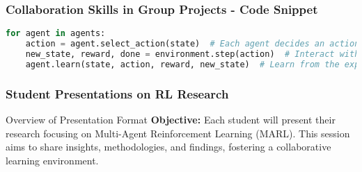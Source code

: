 \documentclass[aspectratio=169]{beamer}
\begin{document}
\begin{frame}[fragile]
    \frametitle{Collaboration Skills in Group Projects - Code Snippet}
    \begin{lstlisting}[language=Python]
for agent in agents:
    action = agent.select_action(state)  # Each agent decides an action
    new_state, reward, done = environment.step(action)  # Interact with the environment
    agent.learn(state, action, reward, new_state)  # Learn from the experience
    \end{lstlisting}
\end{frame}

\begin{frame}
    \frametitle{Student Presentations on RL Research}
    \begin{block}{Overview of Presentation Format}
        \textbf{Objective:} Each student will present their research focusing on Multi-Agent Reinforcement Learning (MARL). This session aims to share insights, methodologies, and findings, fostering a collaborative learning environment.
    \end{block}
\end{frame}
\end{document}
